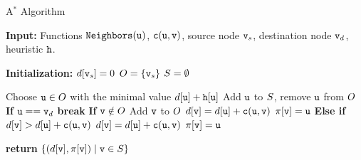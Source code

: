 \begin{algorithm}
\caption{A$^*$ Algorithm}
\label{Alg:ASTAR}
\begin{algorithmic}[1]
\State \textbf{Input:} Functions $\texttt{Neighbors}({\tt u})$, ${\tt c}({\tt u}, {\tt v})$, source node ${\tt v}_s$, destination node ${\tt v}_d$, heuristic ${\tt h}$.

\State \textbf{Initialization:} 
\State \quad $d[{\tt v}_s] = 0$
\State \quad ${O} = \{{\tt v}_s\}$
\State \quad ${S} = \emptyset$

\While{$\openset \neq \emptyset$}
    \State Choose ${\tt u} \in {O}$ with the minimal value \textcolor{blue}{$d[{\tt u}] + {\tt h}[{\tt u}]$}
    \State Add ${\tt u}$ to ${S}$, remove ${\tt u}$ from ${O}$
    \State \textbf{If} {${\tt u} == {\tt v}_d$}
        \State \quad \textbf{break}
        \State \textbf{If} ${\tt v} \notin {O}$
        \State \quad Add ${\tt v}$ to ${O}$
        \State \quad $d[{\tt v}] = d[{\tt u}] + {\tt c}({\tt u}, {\tt v})$
        \State \quad $\pi[{\tt v}] = {\tt u}$
        \State \textbf{Else if} {$d[{\tt v}] > d[{\tt u}] + {\tt c}({\tt u}, {\tt v})$}
            \State \quad $d[{\tt v}] = d[{\tt u}] + {\tt c}({\tt u}, {\tt v})$
            \State \quad $\pi[{\tt v}] = {\tt u}$
    \EndFor
\EndWhile

\State \textbf{return} $\{(d[{\tt v}], \pi[{\tt v}]) \mid {\tt v} \in {S}\}$
\end{algorithmic}



\end{algorithm}


